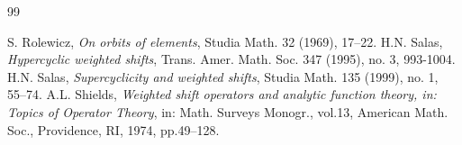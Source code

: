 \documentclass[12pt, reqno]{amsart}
\theoremstyle{definition}
\theoremstyle{remark}
\numberwithin{equation}{section}
\begin{document}
\begin{thebibliography}{99}



 S. Rolewicz, \textit{On orbits of elements}, Studia Math. 32 (1969), 17–22.
 H.N. Salas, \textit{Hypercyclic weighted shifts}, Trans. Amer. Math. Soc. 347 (1995), no. 3, 993-1004.
 H.N. Salas, \textit{Supercyclicity and weighted shifts}, Studia Math. 135 (1999), no. 1, 55–74.
 A.L. Shields, \textit{Weighted shift operators and analytic function theory, in: Topics of Operator Theory}, in: Math. Surveys Monogr., vol.13, American Math. Soc., Providence, RI, 1974, pp.49–128.
\end{thebibliography}
\end{document}
